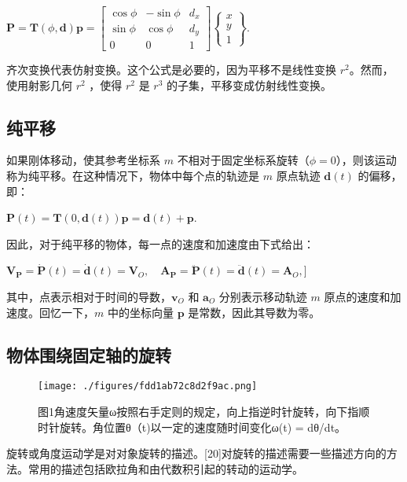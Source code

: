 $\mathbf{P} = \mathbf{T}(\phi, \mathbf{d}) \mathbf{p} = \begin{bmatrix}\cos \phi & -\sin \phi & d_x \\\sin \phi & \cos \phi & d_y \\0 & 0 & 1\end{bmatrix}\begin{Bmatrix}x \\ y \\1\end{Bmatrix}$.

齐次变换代表仿射变换。这个公式是必要的，因为平移不是线性变换 $ r^2 $。然而，使用射影几何 $r^2 $ ，使得 $ r^2 $ 是 $ r^3 $ 的子集，平移变成仿射线性变换。

\subsection{纯平移}

如果刚体移动，使其参考坐标系 $m$ 不相对于固定坐标系旋转（$\phi = 0$），则该运动称为纯平移。在这种情况下，物体中每个点的轨迹是 $m$ 原点轨迹 $\mathbf{d}(t)$ 的偏移，即：

$\mathbf{P}(t) = \mathbf{T}(0, \mathbf{d}(t))\mathbf{p} = \mathbf{d}(t) + \mathbf{p}$.

因此，对于纯平移的物体，每一点的速度和加速度由下式给出：

$\mathbf{V}_{\mathbf{P}} = \dot{\mathbf{P}}(t) = \dot{\mathbf{d}}(t) = \mathbf{V}_O, \quad \mathbf{A}_{\mathbf{P}} = \ddot{\mathbf{P}}(t) = \ddot{\mathbf{d}}(t) = \mathbf{A}_O,$]

其中，点表示相对于时间的导数，$\mathbf{v}_O$ 和 $\mathbf{a}_O$ 分别表示移动轨迹 $m$ 原点的速度和加速度。回忆一下，$m$ 中的坐标向量 $\mathbf{p}$ 是常数，因此其导数为零。

\subsection{ 物体围绕固定轴的旋转}

\begin{figure}[ht]
\centering
\texttt{[image: ./figures/fdd1ab72c8d2f9ac.png]}
\caption{图1角速度矢量ω按照右手定则的规定，向上指逆时针旋转，向下指顺时针旋转。角位置θ（t)以一定的速度随时间变化ω(t) = dθ/dt。} \label{fig_YDX_11}
\end{figure}

旋转或角度运动学是对对象旋转的描述。[20]对旋转的描述需要一些描述方向的方法。常用的描述包括欧拉角和由代数积引起的转动的运动学。

